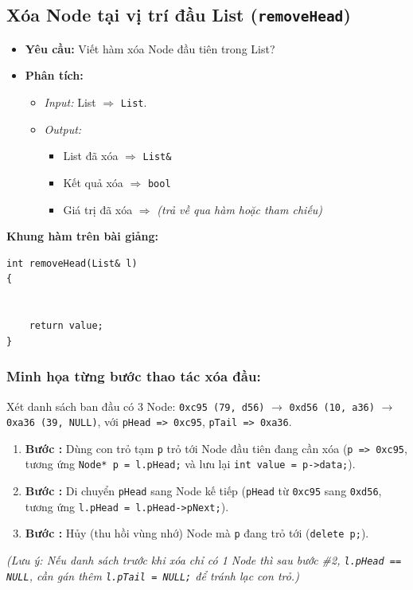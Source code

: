 \documentclass[12pt,a4paper]{article}
\begin{document}
\needspace{7.5cm}
\subsection{Xóa Node tại vị trí đầu List (\texttt{removeHead})}
\begin{itemize}[itemsep=0.15em]
    \item \textbf{Yêu cầu:} Viết hàm xóa Node đầu tiên trong List?
    \item \textbf{Phân tích:}
    \begin{itemize}
        \item \textit{Input:} List $\Rightarrow$ \texttt{List}.
        \item \textit{Output:}
        \begin{itemize}
            \item List đã xóa $\Rightarrow$ \texttt{List\&}
            \item Kết quả xóa $\Rightarrow$ \texttt{bool}
            \item Giá trị đã xóa $\Rightarrow$ \textit{(trả về qua hàm hoặc tham chiếu)}
        \end{itemize}
    \end{itemize}
\end{itemize}
\textbf{Khung hàm trên bài giảng:}
\begin{lstlisting}
int removeHead(List& l)
{


    return value;
}
\end{lstlisting}

\subsubsection*{Minh họa từng bước thao tác xóa đầu:}
Xét danh sách ban đầu có 3 Node: \texttt{0xc95 (79, d56)} $\rightarrow$ \texttt{0xd56 (10, a36)} $\rightarrow$ \texttt{0xa36 (39, NULL)}, với \texttt{pHead => 0xc95}, \texttt{pTail => 0xa36}.
\begin{enumerate}[itemsep=0.2em]
    \item \textbf{Bước :} Dùng con trỏ tạm \texttt{p} trỏ tới Node đầu tiên đang cần xóa (\texttt{p => 0xc95}, tương ứng \texttt{Node* p = l.pHead;} và lưu lại \texttt{int value = p->data;}).
    \item \textbf{Bước :} Di chuyển \texttt{pHead} sang Node kế tiếp (\texttt{pHead} từ \texttt{0xc95} sang \texttt{0xd56}, tương ứng \texttt{l.pHead = l.pHead->pNext;}).
    \item \textbf{Bước :} Hủy (thu hồi vùng nhớ) Node mà \texttt{p} đang trỏ tới (\texttt{delete p;}).
\end{enumerate}
\textit{(Lưu ý: Nếu danh sách trước khi xóa chỉ có 1 Node thì sau bước \#2, \texttt{l.pHead == NULL}, cần gán thêm \texttt{l.pTail = NULL;} để tránh lạc con trỏ.)}
\end{document}
